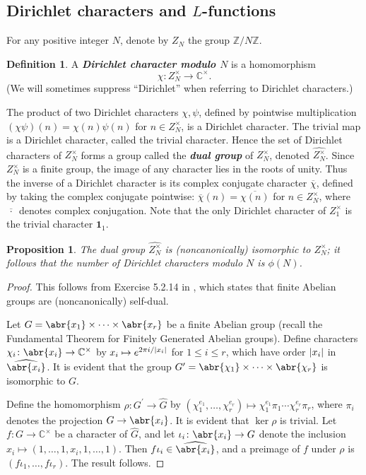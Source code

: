 \documentclass[10pt,leqno,twoside]{article}
\theoremstyle{plain}
\newtheorem{proposition}[lem]{Proposition}
\theoremstyle{definition}
\newtheorem{definition/}[lem]{Definition}
\newenvironment{definition}
  {\renewcommand{\qedsymbol}{\textdagger}%
   \pushQED{\qed}\begin{definition/}}
  {\popQED\end{definition/}}
\numberwithin{equation}{section}
\numberwithin{lem}{section}
\newcommand{\textib}[1]{\textbf{\textit{#1\index{#1}}}} %
\begin{document}
\subsection{Dirichlet characters and $L$-functions}
For any positive integer $N$, denote by $Z_N$ the group $\mathbb{Z}/N\mathbb{Z}$.
\begin{definition}
    A \textib{Dirichlet character modulo $N$} is a homomorphism 
    \[\chi\colon Z_N^\times\to \mathbb{C}^\times.\] (We will sometimes suppress ``Dirichlet'' when referring to Dirichlet characters.)
\end{definition}
The product of two Dirichlet characters $\chi,\psi$, defined by pointwise multiplication $(\chi\psi)(n) = \chi(n)\psi(n)$ for $n\in Z_N^\times$, is a Dirichlet character. The trivial map is a Dirichlet character, called the trivial character. Hence the set of Dirichlet characters of $Z_N^\times$ forms a group called the \textib{dual group} of $Z_N^\times$, denoted $\widehat{Z_N^\times}$. Since $Z_N^\times$ is a finite group, the image of any character lies in the roots of unity. Thus the inverse of a Dirichlet character is its complex conjugate character $\overline \chi$, defined by taking the complex conjugate pointwise: $\overline\chi(n) = \overline{\chi(n)}$ for $n\in Z_N^\times$, where $\overline{\,\cdot\,}$ denotes complex conjugation. Note that the only Dirichlet character of $Z_1^\times$ is the trivial character $\mathbf{1}_1$. 

\begin{proposition}
    The dual group $\widehat{Z_N^\times}$ is (noncanonically) isomorphic to $Z_N^\times$; it follows that the number of Dirichlet characters modulo $N$ is $\phi(N)$.
\end{proposition}

\begin{proof}
    This follows from Exercise 5.2.14 in \cite{df}, which states that finite Abelian groups are (noncanonically) self-dual. 

    Let $G = \abr{x_1}\times\cdots\times\abr{x_r}$ be a finite Abelian group (recall the Fundamental Theorem for Finitely Generated Abelian groups). Define characters $\chi_i\colon \abr{x_i}\to \mathbb C^\times$ by $x_i\mapsto e^{2\pi i/\abs{x_i}}$ for $1\leq i\leq r$, which have order $\abs{x_i}$ in $\widehat{\abr{x_i}}$. It is evident that the group $G^\prime = \abr{\chi_1}\times\cdots\times \abr{\chi_r}$ is isomorphic to $G$.

    Define the homomorphism $\rho\colon G^\prime\to \widehat G$ by $(\chi_1^{e_1},\dots,\chi_r^{e_r})\mapsto \chi_1^{e_1}\pi_1\cdots\chi_r^{e_r}\pi_r$, where $\pi_i$ denotes the projection $G\to \abr{x_i}$. It is evident that $\ker\rho$ is trivial. Let $f\colon G\to\mathbb C^\times$ be a character of $\widehat G$, and let $\iota_i\colon \abr{x_i}\to G$ denote the inclusion $x_i\mapsto (1,\dots,1,x_i,1,\dots,1)$. Then $f\iota_i\in \widehat{\abr{x_i}}$, and a preimage of $f$ under $\rho$ is $(f\iota_1,\dots,f\iota_r)$. The result follows.
\end{proof}
\end{document}
